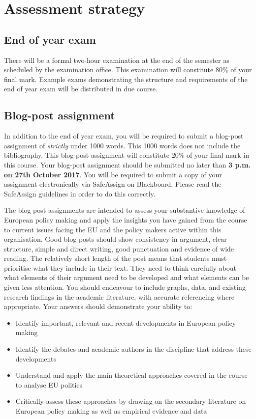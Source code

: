 
\section*{Assessment strategy}

\subsection*{End of year exam}

	There will be a formal two-hour examination at the end of the semester as scheduled by the examination office. This examination will constitute 80\% of your final mark. Example exams demonstrating the structure and requirements of the end of year exam will be distributed in due course.

\subsection*{Blog-post assignment}

	In addition to the end of year exam, you will be required to submit a blog-post assignment of \textit{strictly} under 1000 words. This 1000 words does not include the bibliography. This blog-post assignment will constitute 20\% of your final mark in this course. Your blog-post assignment should be submitted no later than \textbf{3 p.m. on 27th October 2017}. You will be required to submit a copy of your assignment electronically via SafeAssign on Blackboard. Please read the SafeAssign guidelines in order to do this correctly.

	The blog-post assignments are intended to assess your substantive knowledge of European policy making and apply the insights you have gained from the course to current issues facing the EU and the policy makers active within this organisation. Good blog posts should show consistency in argument, clear structure, simple and direct writing, good punctuation and evidence of wide reading. The relatively short length of the post means that students must prioritise what they include in their text. They need to think carefully about what elements of their argument need to be developed and what elements can be given less attention. You should endeavour to include graphs, data, and existing research findings in the academic literature, with accurate referencing where appropriate. Your answers should demonstrate your ability to:

\begin{itemize}
	\item Identify important, relevant and recent developments in European policy making
	\item Identify the debates and academic authors in the discipline that address these developments
	\item Understand and apply the main theoretical approaches covered in the course to analyse EU politics
	\item Critically assess these approaches by drawing on the secondary literature on European policy making as well as empirical evidence and data
\end{itemize}

